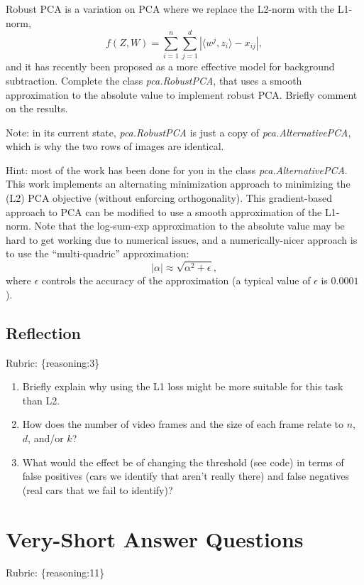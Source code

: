 \documentclass{article}
\def\rubric#1{\gre{Rubric: \{#1\}}}{}
\def\blu#1{{\color{blu}#1}}
\def\gre#1{{\color{gre}#1}}
\def\enum#1{\begin{enumerate}#1\end{enumerate}}
\begin{document}
Robust PCA is a variation on PCA where we replace the L2-norm with the L1-norm,
\[
f(Z,W) = \sum_{i=1}^n\sum_{j=1}^d |\langle w^j, z_i\rangle - x_{ij}|,
\]
and it has recently been proposed as a more effective model for background subtraction. \blu{Complete the class \emph{pca.RobustPCA},
that uses a smooth approximation to the absolute value to implement robust PCA. Briefly comment on the results.} 

Note: in its current state, \emph{pca.RobustPCA} is just a copy of \emph{pca.AlternativePCA}, which is why the two rows of images are identical.

Hint: most of the work has been done for you in the class \emph{pca.AlternativePCA}.
This work implements an alternating minimization approach to minimizing the (L2) PCA objective (without enforcing orthogonality). This gradient-based approach to PCA can be modified to use a smooth approximation of the L1-norm. Note that the log-sum-exp approximation to the absolute value may be hard to get working due to numerical issues, and a numerically-nicer approach is to use the ``multi-quadric'' approximation:
\[
|\alpha| \approx \sqrt{\alpha^2 + \epsilon},
\]
where $\epsilon$ controls the accuracy of the approximation (a typical value of $\epsilon$ is $0.0001$).



\subsection{Reflection}
\rubric{reasoning:3}

\enum{
\item Briefly explain why using the L1 loss might be more suitable for this task than L2. 
\item How does the number of video frames and the size of each frame relate to $n$, $d$, and/or $k$?
\item What would the effect be of changing the threshold (see code) in terms of false positives (cars we identify that aren't really there) and false negatives (real cars that we fail to identify)?
}

\section{Very-Short Answer Questions}
\rubric{reasoning:11}
\end{document}
